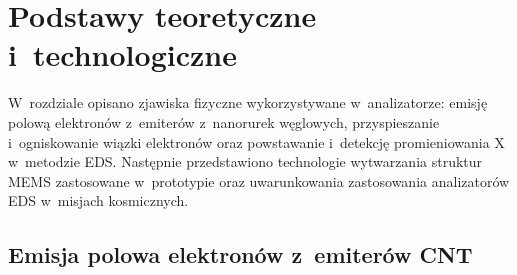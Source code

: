 \providecommand{\TODO}[1]{\textcolor{red}{[TODO: #1]}}

\chapter{Podstawy teoretyczne i~technologiczne}
\label{ch:podstawy}

\begin{zmiana}
W~rozdziale opisano zjawiska fizyczne wykorzystywane w~analizatorze:
emisję polową elektronów z~emiterów z~nanorurek węglowych, przyspieszanie
i~ogniskowanie wiązki elektronów oraz powstawanie i~detekcję
promieniowania X w~metodzie EDS. Następnie przedstawiono technologie
wytwarzania struktur MEMS zastosowane w~prototypie oraz uwarunkowania
zastosowania analizatorów EDS w~misjach kosmicznych.
\end{zmiana}

\section{Emisja polowa elektronów z~emiterów CNT}
\label{sec:emisja}

